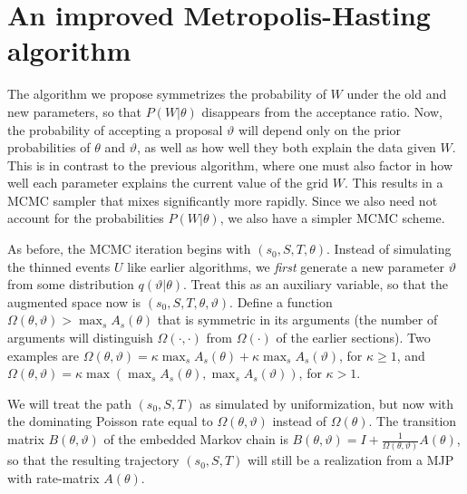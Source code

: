 \section{An improved Metropolis-Hasting algorithm}
The algorithm we propose symmetrizes the probability of $W$ under the old and new parameters, so that $P(W|\theta)$ disappears from the acceptance ratio. 
Now, the probability of accepting a proposal $\vartheta$ will depend only on the prior probabilities of $\theta$ and $\vartheta$, as well as how well they both explain the data given $W$.
This is in contrast to the previous algorithm, where one must also factor in how well each parameter explains the current value of the grid $W$.
This results in a MCMC sampler that mixes significantly more rapidly. 
Since we also need not account for the probabilities $P(W|\theta)$, we also have a simpler MCMC scheme.

As before, the MCMC iteration begins with $(s_0, S, T, \theta)$. 
Instead of simulating the thinned events $U$ like earlier algorithms, we {\em first} generate a new parameter $\vartheta$ from some distribution $q(\vartheta|\theta)$. 
Treat this as an auxiliary variable, so that the augmented space now is $(s_0,S, T, \theta,\vartheta)$. 
Define a function $\Omega(\theta,\vartheta) > \max_s A_s(\theta)$ that is symmetric in its arguments (the number of arguments will distinguish $\Omega(\cdot,\cdot)$ from $\Omega(\cdot)$ of the earlier sections).
Two examples are $\Omega(\theta,\vartheta) = \kappa \max_s A_s(\theta) + \kappa \max_s A_s(\vartheta)$, for $\kappa \ge 1$, and 
$\Omega(\theta,\vartheta) = \kappa \max\left(\max_s A_s(\theta), \max_s A_s(\vartheta)\right)$, for $\kappa > 1$.


We will treat the path $(s_0,S,T)$ as simulated by  uniformization, but now with the dominating Poisson rate equal to $\Omega(\theta,\vartheta)$  instead of $\Omega(\theta)$. 
The transition matrix $B(\theta,\vartheta)$ of the embedded Markov chain is $B(\theta,\vartheta) = I + \frac{1}{\Omega(\theta,\vartheta)}A(\theta)$, so that the resulting trajectory $(s_0,S,T)$ will still be a realization from a MJP with rate-matrix $A(\theta)$.

